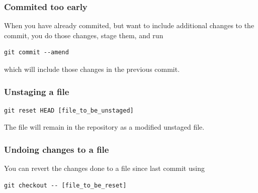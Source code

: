 \documentclass[12p,a4paper]{article}
\begin{document}
\subsubsection{Commited too early}
When you have already commited, but want to include additional changes to the commit, you do those changes, stage them, and run
\begin{verbatim}
git commit --amend
\end{verbatim}
which will include those changes in the previous commit.


\subsubsection{Unstaging a file}
\begin{verbatim}
git reset HEAD [file_to_be_unstaged]
\end{verbatim}
The file will remain in the repository as a modified unstaged file.


\subsubsection{Undoing changes to a file}
You can revert the changes done to a file since last commit using
\begin{verbatim}
git checkout -- [file_to_be_reset]
\end{verbatim}
\end{document}
